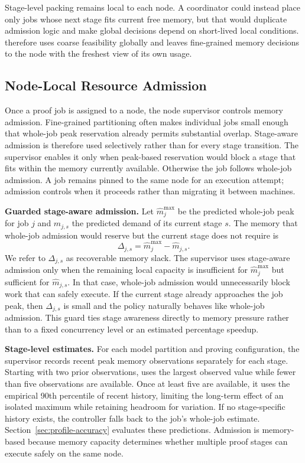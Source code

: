 Stage-level packing remains local to each node. A coordinator could instead place only jobs whose next stage fits current free memory, but that would duplicate admission logic and make global decisions depend on short-lived local conditions. \TITLE{} therefore uses coarse feasibility globally and leaves fine-grained memory decisions to the node with the freshest view of its own usage.

\subsection{Node-Local Resource Admission}
\label{sec:local-admission}

Once a proof job is assigned to a node, the node supervisor controls memory admission. Fine-grained partitioning often makes individual jobs small enough that whole-job peak reservation already permits substantial overlap. Stage-aware admission is therefore used selectively rather than for every stage transition. The supervisor enables it only when peak-based reservation would block a stage that fits within the memory currently available. Otherwise the job follows whole-job admission. A job remains pinned to the same node for an execution attempt; admission controls when it proceeds rather than migrating it between machines.

\textbf{Guarded stage-aware admission.}
Let \(\widehat{m}^{\max}_j\) be the predicted whole-job peak for job \(j\) and \(\widehat{m}_{j,s}\) the predicted demand of its current stage \(s\). The memory that whole-job admission would reserve but the current stage does not require is
\begin{equation}
    \Delta_{j,s}=\widehat{m}^{\max}_j-\widehat{m}_{j,s}.
    \label{eq:recoverable-slack}
\end{equation}
We refer to \(\Delta_{j,s}\) as recoverable memory slack. The supervisor uses stage-aware admission only when the remaining local capacity is insufficient for \(\widehat{m}^{\max}_j\) but sufficient for \(\widehat{m}_{j,s}\). In that case, whole-job admission would unnecessarily block work that can safely execute. If the current stage already approaches the job peak, then \(\Delta_{j,s}\) is small and the policy naturally behaves like whole-job admission. This guard ties stage awareness directly to memory pressure rather than to a fixed concurrency level or an estimated percentage speedup.

\textbf{Stage-level estimates.}
For each model partition and proving configuration, the supervisor records recent peak memory observations separately for each stage. Starting with two prior observations, \TITLE{} uses the largest observed value while fewer than five observations are available. Once at least five are available, it uses the empirical 90th percentile of recent history, limiting the long-term effect of an isolated maximum while retaining headroom for variation. If no stage-specific history exists, the controller falls back to the job's whole-job estimate. Section~\ref{sec:profile-accuracy} evaluates these predictions. Admission is memory-based because memory capacity determines whether multiple proof stages can execute safely on the same node.

